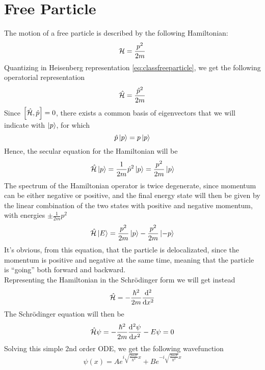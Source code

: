 \documentclass[../qm.tex]{subfiles}
\begin{document}
	\section{Free Particle}
	The motion of a free particle is described by the following Hamiltonian:
	\begin{equation}
		\mathcal{H}=\frac{p^2}{2m}
		\label{eq:classfreeparticle}
	\end{equation}
	Quantizing in Heisenberg representation \eqref{eq:classfreeparticle}, we get the following operatorial representation
	\begin{equation}
		\hat{\mathcal{H}}=\frac{\hat{p}^2}{2m}
		\label{eq:quantfreeparticle}
	\end{equation}
	Since $\comm{\opr{\ham}}{\opr{p}}=0$, there exists a common basis of eigenvectors that we will indicate with $\ket{p}$, for which
	\begin{equation*}
		\hat{p}\ket{p}=p\ket{p}
	\end{equation*}
	Hence, the secular equation for the Hamiltonian will be
	\begin{equation}
		\hat{\mathcal{H}}\ket{p}=\frac{1}{2m}\hat{p}^2\ket{p}=\frac{p^2}{2m}\ket{p}
		\label{eq:energylevels}
	\end{equation}
	The spectrum of the Hamiltonian operator is twice degenerate, since momentum can be either negative or positive, and the final energy state will then be given by the linear combination of the two states with positive and negative momentum, with energies $\pm \frac{1}{2m}p^2$
	\begin{equation}
		\hat{\mathcal{H}}\ket{E}=\frac{p^2}{2m}\ket{p}-\frac{p^2}{2m}\ket{-p}
		\label{eq:freepartenergy}
	\end{equation}
	It's obvious, from this equation, that the particle is delocalizated, since the momentum is positive and negative at the same time, meaning that the particle is ``going'' both forward and backward.\\
	Representing the Hamiltonian in the Schrödinger form we will get instead
	\begin{equation}
		\opr{\ham}=-\frac{\hbar^2}{2m}\derivative[2]{x}
		\label{eq:schrfreepart}
	\end{equation}
	The Schrödinger equation will then be
	\begin{equation}
		\opr{\ham}\psi=-\frac{\hbar^2}{2m}\derivative[2]{\psi}{x}-E\psi=0
		\label{eq:schreqfreepart}
	\end{equation}
	Solving this simple 2nd order ODE, we get the following wavefunction
	\begin{equation}
		\psi(x)=Ae^{i\sqrt{\frac{2mE}{\hbar^2}}x}+Be^{-i\sqrt{\frac{2mE}{\hbar^2}}x}
		\label{eq:freepartwavefunction}
	\end{equation}
\end{document}
